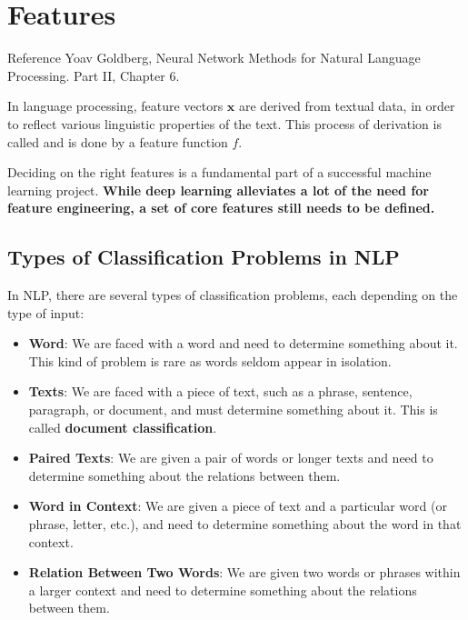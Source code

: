 \chapter{Features}

\begin{note}{Reference}
    Yoav Goldberg, Neural Network Methods for Natural Language Processing.\cite{goldberg2017neural}
    Part II, Chapter 6.
\end{note}

In language processing, feature vectors $\mathbf{x}$ are derived from textual data, in order to reflect various linguistic properties of the text. This process of derivation is called  and is done by a feature function $f$.

Deciding on the right features is a fundamental part of a successful machine learning project. \textbf{While deep learning alleviates a lot of the need for feature engineering, a set of core features still needs to be defined.}

\section{Types of Classification Problems in NLP}
In NLP, there are several types of classification problems, each depending on the type of input:

\begin{itemize}
    \item \textbf{Word}: We are faced with a word and need to determine something about it. This kind of problem is rare as words seldom appear in isolation.
    \item \textbf{Texts}: We are faced with a piece of text, such as a phrase, sentence, paragraph, or document, and must determine something about it. This is called \textbf{document classification}.
    \item \textbf{Paired Texts}: We are given a pair of words or longer texts and need to determine something about the relations between them.
    \item \textbf{Word in Context}: We are given a piece of text and a particular word (or phrase, letter, etc.), and need to determine something about the word in that context.
    \item \textbf{Relation Between Two Words}: We are given two words or phrases within a larger context and need to determine something about the relations between them.
\end{itemize}

